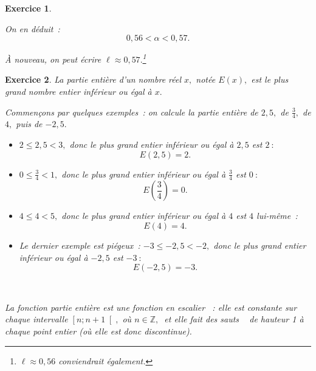 \documentclass[10pt]{article}
\newtheorem{exo}{Exercice}
\begin{document}
\begin{exo}
\begin{enumerate}
\begin{enumerate}
\begin{itemize}
\medskip



On en déduit~:\[0,56<\alpha<0,57.\]

\`A nouveau, on peut écrire $\ell\approx 0,57.$\footnote{$\ell\approx 0,56$ conviendrait également.}
\end{itemize}
\end{enumerate} 
\end{enumerate}
 \end{exo}
 
 \begin{exo}

La partie entière d'un nombre réel $x,$ notée $E(x),$ est le plus grand nombre entier inférieur ou égal à $x.$

\medskip

Commençons par quelques exemples~: on calcule la partie entière de $2,5,$ de $\frac{3}{4},$ de $4,$ puis de $-2,5.$

\medskip

\begin{itemize}
\item[\textbullet] $2\leq 2,5<3,$ donc le plus grand entier inférieur ou égal à $2,5$ est $2~:$
\[E(2,5)=2.\]
\item[\textbullet] $0\leq \frac{3}{4}<1,$ donc le plus grand entier inférieur ou égal à $\frac{3}{4}$ est $0~:$
\[E\left(\frac{3}{4}\right)=0.\]
\item[\textbullet] $4\leq 4<5,$ donc le plus grand entier inférieur ou égal à $4$ est $4$ lui-même~:
\[E(4)=4.\]
\item[\textbullet] Le dernier exemple est piégeux~: $-3\leq -2,5<-2,$ donc le plus grand entier inférieur ou égal à $-2,5$ est $-3~:$
\[E(-2,5)=-3.\]
\end{itemize}

\medskip
\

La fonction partie entière est une fonction \og en escalier \fg~{}: elle est constante sur chaque intervalle $\left[n;n+1\right[,$ où $n\in\mathbb{Z},~$ et elle fait des \og sauts \fg~{} de hauteur 1 à chaque point entier (où elle est donc discontinue).


\end{exo}
\end{document}
